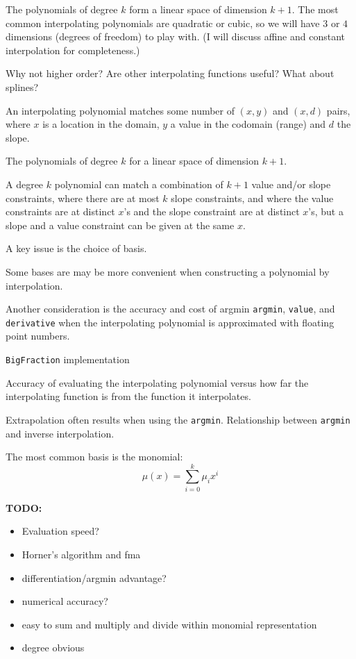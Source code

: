The polynomials of degree $k$ form a linear space of dimension
$k+1$\cite{wiki:Polynomial}.
The most common interpolating polynomials are quadratic or cubic,
so we will have $3$ or $4$ dimensions (degrees of freedom) to play
with. 
(I will discuss affine and constant interpolation for 
completeness.)

Why not higher order? Are other interpolating functions useful?
What about splines?

An interpolating polynomial matches some number of $(x,y)$
and $(x,d)$ pairs, where $x$ is a location in the domain,
$y$ a value in the codomain (range) and $d$ the slope.

The polynomials of degree $k$ for a linear space of dimension
$k+1$. 

A degree $k$ polynomial can match a combination of $k+1$ value 
and/or 
slope constraints, where there are at most $k$ slope constraints,
and where the value constraints are at distinct $x$'s and the
slope constraint are at distinct $x$'s, but a slope and a value 
constraint can be given at the same $x$.

A key issue is the choice of basis.

Some bases are may be more convenient when constructing a 
polynomial by interpolation.

Another consideration is the accuracy and cost of 
argmin \texttt{argmin}, \texttt{value}, and \texttt{derivative} 
when the interpolating polynomial is approximated with 
floating point numbers.

\texttt{BigFraction} implementation

Accuracy of evaluating the interpolating polynomial
versus how far the interpolating function is from the function it
interpolates.

Extrapolation often results when using the \texttt{argmin}.
Relationship between \texttt{argmin} and inverse interpolation.

\setcounter{currentlevel}{\value{baseSectionLevel}}
\label{sec:Monomial-basis}

The most common basis is the monomial:
\begin{equation}
\mu(x) = \sum_{i=0}^{k} \mu_i x^i
\end{equation}

\textbf{TODO:} 
\begin{itemize}
  \item Evaluation speed?
  \item Horner's algorithm and fma
  \item differentiation/argmin advantage?
  \item numerical accuracy?
  \item easy to sum and multiply and divide within monomial
  representation
  \item degree obvious
\end{itemize}

